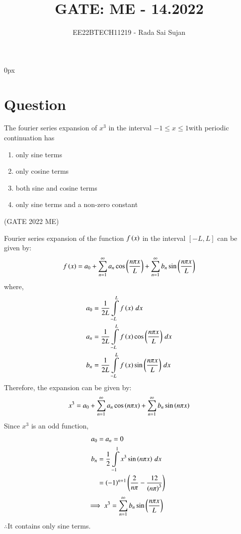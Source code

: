 \documentclass[journal,12pt,twocolumn]{IEEEtran}
\theoremstyle{remark}
\begin{document}
\parindent 0px

\title{GATE: ME - 14.2022}
\author{EE22BTECH11219 - Rada Sai Sujan$^{}$%
}
\maketitle
\newpage
\bigskip
\section*{Question}
The fourier series expansion of $x^3$ in the interval $-1\leq x\leq 1$with periodic continuation has
\begin{enumerate}[label=(\alph*)]
    \item only sine terms
    \item only cosine terms
    \item both sine and cosine terms
    \item only sine terms and a non-zero constant
\end{enumerate} \hfill(GATE 2022 ME)    \\
\solution

Fourier series expansion of the function $f\left(x\right)$ in the interval $[-L,L]$ can be given by: \\
\begin{align}
    f\left(x\right)=a_0+\sum\limits_{n=1}^{\infty}a_n\cos\left(\frac{n\pi x}{L}\right)+\sum\limits_{n=1}^{\infty}b_n\sin\left(\frac{n\pi x}{L}\right)
\end{align}
where,
\begin{align}
    a_0&=\frac{1}{2L}\int\limits_{-L}^{L}f\left(x\right)\,dx  \\
    a_n&=\frac{1}{2L}\int\limits_{-L}^{L}f\left(x\right)\cos\left(\frac{n\pi x}{L}\right)\,dx  \\
    b_n&=\frac{1}{2L}\int\limits_{-L}^{L}f\left(x\right)\sin\left(\frac{n\pi x}{L}\right)\,dx  \\
\end{align}
Therefore, the expansion can be given by:
\begin{align}
    x^3=a_0+\sum\limits_{n=1}^{\infty}a_n\cos\left(n\pi x\right)+\sum\limits_{n=1}^{\infty}b_n\sin\left(n\pi x\right)
\end{align}
Since $x^3$ is an odd function,
\begin{align}
    a_0&=a_n=0   \\
    b_n&=\frac{1}{2}\int\limits_{-1}^{1}x^3\sin\left(n\pi x\right)\,dx    \\
    &=\left(-1\right)^{n+1}\left(\frac{2}{n\pi}-\frac{12}{\left(n\pi\right)^3}\right) \
\end{align}
\begin{align}
    \implies x^3&=\sum\limits_{n=1}^{\infty}b_n\sin\left(\frac{n\pi x}{L}\right)
\end{align}
$\therefore$It contains only sine terms.
\end{document}
